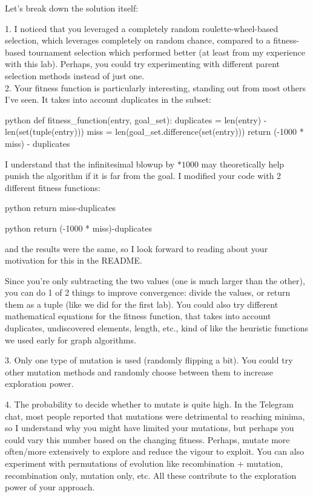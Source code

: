 Let's break down the solution itself:

1. I noticed that you leveraged a completely random roulette-wheel-based selection, which leverages completely on random chance, compared to a fitness-based tournament selection which performed better (at least from my experience with this lab). Perhaps, you could try experimenting with different parent selection methods instead of just one. \\

2. Your fitness function is particularly interesting, standing out from most others I've seen. It takes into account duplicates in the subset:

\begin{mintedbox}{python}
  def fitness_function(entry, goal_set):
    duplicates = len(entry) - len(set(tuple(entry)))
    miss = len(goal_set.difference(set(entry)))
    return (-1000 * miss) - duplicates
\end{mintedbox}

I understand that the infinitesimal blowup by $*1000$ may theoretically help punish the algorithm if it is far from the goal. I modified your code with 2 different fitness functions:

\begin{mintedbox}{python}
  return miss-duplicates
\end{mintedbox}

\begin{mintedbox}{python}
  return (-1000 * miss)-duplicates
\end{mintedbox}

and the results were the same, so I look forward to reading about your motivation for this in the README.

Since you're only subtracting the two values (one is much larger than the other), you can do 1 of 2 things to improve convergence: divide the values, or return them as a tuple (like we did for the first lab).
You could also try different mathematical equations for the fitness function, that takes into account duplicates, undiscovered elements, length, etc., kind of like the heuristic functions we used early for graph algorithms.

3. Only one type of mutation is used (randomly flipping a bit). You could try other mutation methods and randomly choose between them to increase exploration power.

4. The probability to decide whether to mutate is quite high. In the Telegram chat, most people reported that mutations were detrimental to reaching minima, so I understand why you might have limited your mutations, but perhaps you could vary this number based on the changing fitness. Perhaps, mutate more often/more extensively to explore and reduce the vigour to exploit. You can also experiment with permutations of evolution like recombination + mutation, recombination only, mutation only, etc. All these contribute to the exploration power of your approach.


